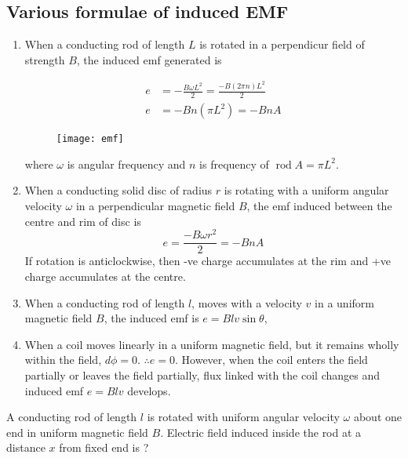 \subsection{ Various formulae of induced EMF}
\begin{enumerate}
	\item  When a conducting rod of length $L$ is rotated in a perpendicur field of strength $B$, the induced emf generated is
	\begin{minipage}{0.5\textwidth}
	$$
	\begin{aligned}
	e&=-\frac{B \omega L^{2}}{2}=\frac{-B(2 \pi n) L^{2}}{2} \\
	e&=-B n\left(\pi L^{2}\right)=-B n A
	\end{aligned}
	$$
	\end{minipage}
\begin{minipage}{0.5\textwidth}
	\begin{figure}[H]
	\begin{center}
		\texttt{[image: emf]}
	\end{center}
\end{figure}
\end{minipage}
	where $\omega$ is angular frequency and $n$ is frequency of $\operatorname{rod} A=\pi L^{2}$.
	\item When a conducting solid disc of radius $r$ is rotating with a uniform angular velocity $\omega$ in a perpendicular magnetic field $B$, the emf induced between the centre and rim of disc is
	$$
	e=\frac{-B \omega r^{2}}{2}=-B n A
	$$
	If rotation is anticlockwise, then -ve charge accumulates at the rim and +ve charge accumulates at the centre.
	\item When a conducting rod of length $l$, moves with a velocity $v$ in a uniform magnetic field $B$, the induced emf is $e=B l v \sin \theta$,
	\item When a coil moves linearly in a uniform magnetic field, but it remains wholly within the field, $d \phi=0$. $\therefore e=0 .$ However, when the coil enters the field partially or leaves the field partially, flux linked with the coil changes and induced emf $e=B l v$ develops.
\end{enumerate}
\begin{exercise}
	A conducting rod of length $l$ is rotated with uniform angular velocity $\omega$ about one end in uniform magnetic field $B$. Electric field induced inside the rod at a distance $x$ from fixed end is ?
\end{exercise}
